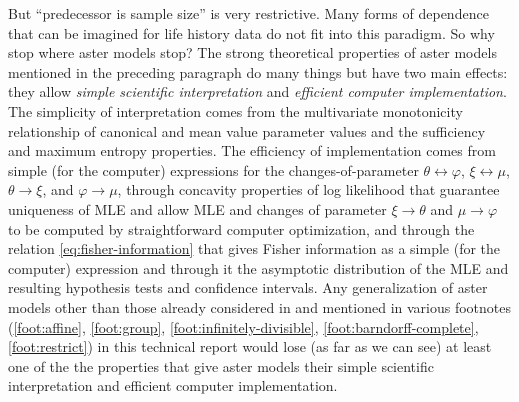 \documentclass[11pt]{article}
\begin{document}
But ``predecessor is sample size'' is very restrictive.  Many forms of
dependence that can be imagined for life history data do not fit into this
paradigm.  So why stop where aster models stop?  The strong theoretical
properties of aster models mentioned in the preceding paragraph do many
things but have two main effects: they allow
\emph{simple scientific interpretation}
and \emph{efficient computer implementation}.
The simplicity of interpretation comes from
the multivariate monotonicity relationship of canonical and mean
value parameter values and the sufficiency and maximum entropy
properties.  The efficiency of implementation comes from
simple (for the computer) expressions for
the changes-of-parameter $\theta \leftrightarrow \varphi$,
$\xi \leftrightarrow \mu$, $\theta \to \xi$, and $\varphi \to \mu$,
through concavity properties of log likelihood that guarantee uniqueness
of MLE and allow MLE and changes of parameter $\xi \to \theta$
and $\mu \to \varphi$ to be computed by straightforward computer optimization,
and through the relation \eqref{eq:fisher-information} that gives Fisher
information as a simple (for the computer) expression
and through it the asymptotic distribution of the MLE and resulting
hypothesis tests and confidence intervals.
Any generalization of aster models other than those already
considered in \citet{aster1} and mentioned in various footnotes
(\ref{foot:affine}, \ref{foot:group}, \ref{foot:infinitely-divisible},
\ref{foot:barndorff-complete}, \ref{foot:restrict}) in this technical report
would lose (as far as we can see) at least one of the the properties that
give aster models their simple scientific interpretation and efficient
computer implementation.
\end{document}
